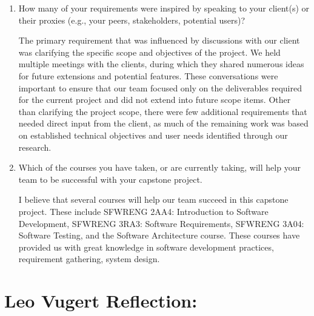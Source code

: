 \begin{enumerate}
  \item How many of your requirements were inspired by speaking to your client(s) or their proxies (e.g., your peers, stakeholders, potential users)?

    \par{The primary requirement that was influenced by discussions with our client was clarifying the specific scope and objectives of the project. We held multiple meetings with the clients, during which they shared numerous ideas for future extensions and potential features. These conversations were important to ensure that our team focused only on the deliverables required for the current project and did not extend into future scope items. Other than clarifying the project scope, there were few additional requirements that needed direct input from the client, as much of the remaining work was based on established technical objectives and user needs identified through our research.}

  \item Which of the courses you have taken, or are currently taking, will help
  your team to be successful with your capstone project.

    \par{I believe that several courses will help our team succeed in this capstone project. These include SFWRENG 2AA4: Introduction to Software Development, SFWRENG 3RA3: Software Requirements, SFWRENG 3A04: Software Testing, and the Software Architecture course. These courses have provided us with great knowledge in software development practices, requirement gathering, system design.}


\end{enumerate}

\section{Leo Vugert Reflection:}

